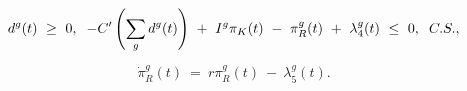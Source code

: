 \begin{equation}
\begin{split}
    d^{g}(t) \ \geq \ 0, \hspace{0.2cm} -C'\left( \sum_{g} d^{g}(t) \right) \ + \ I^{g} \pi_{K}(t) \ - \ \pi_{R}^{g}(t) \ + \ \lambda_{4}^{g}(t) \ \leq \ 0, \hspace{0.2cm} C.S.,
\end{split}
\label{Equation:AKS-Style-Model_Necessary-Conditions_pi-K}
\end{equation}
\begin{equation}
\begin{split}
    \dot{\pi}_{R}^{g}(t) \ = \ r \pi_{R}^{g}(t) \ - \ \lambda_{5}^{g}(t).
\end{split}
\label{Equation:AKS-Style-Model_Necessary-Conditions_pi-R}
\end{equation}
